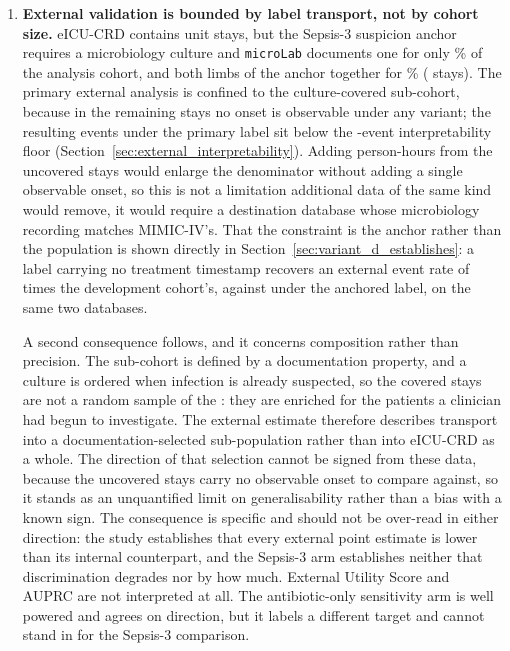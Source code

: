 \begin{enumerate}
    \item \textbf{External validation is bounded by label transport, not by
    cohort size.}\label{lim:label_transport} eICU-CRD contains \pcExtNCohortStays{} unit stays, but the
    Sepsis-3 suspicion anchor requires a microbiology culture and
    \texttt{microLab} documents one for only \pcExtMicroCoverage\% of the
    analysis cohort, and both limbs of the anchor together for
    \pcExtBothLimbCoverage\% (\pcExtNBothLimbStays{} stays). The primary
    external analysis is confined to the culture-covered
    sub-cohort, because in the remaining stays no onset is observable under any
    variant; the resulting \pcExtNEventsB{} events under the primary label sit
    below the \pcExtMinEvents{}-event interpretability floor
    (Section~\ref{sec:external_interpretability}). Adding person-hours from the
    uncovered stays would enlarge the denominator without adding a single
    observable onset, so this is not a limitation additional data of the same
    kind would remove, it would require a destination database whose
    microbiology recording matches MIMIC-IV's. That the constraint is the
    anchor rather than the population is shown directly in
    Section~\ref{sec:variant_d_establishes}: a label carrying no treatment
    timestamp recovers an external event rate of \pcExtAltRateRatio{} times the
    development cohort's, against \pcExtRateRatioB{} under the anchored label,
    on the same two databases.

    A second consequence follows, and it concerns composition rather than
    precision. The sub-cohort is defined by a documentation property, and a
    culture is ordered when infection is already suspected, so the
    \pcExtNMicroStays{} covered stays are not a random sample of the
    \pcExtNCohortStays: they are enriched for the patients a clinician had
    begun to investigate. The external estimate therefore describes transport
    into a documentation-selected sub-population rather than into eICU-CRD as a
    whole. The direction of that selection cannot be signed from these data,
    because the uncovered stays carry no observable onset to compare against,
    so it stands as an unquantified limit on generalisability rather than a
    bias with a known sign. The consequence is specific and
    should not be over-read in either direction: the study establishes that
    every external point estimate is lower than its internal counterpart, and
    the Sepsis-3 arm establishes neither that discrimination degrades nor by
    how much.
    External Utility Score and AUPRC are not interpreted at all. The
    antibiotic-only sensitivity arm is well powered and agrees on direction,
    but it labels a different target and cannot stand in for the Sepsis-3
    comparison.


\end{enumerate}
